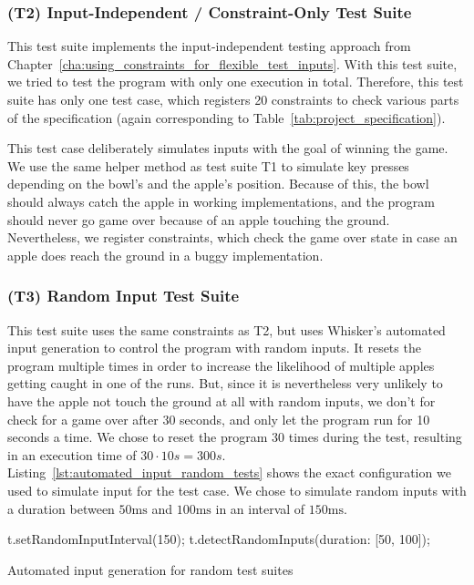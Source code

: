 \subsubsection{(T2) Input-Independent / Constraint-Only Test Suite}

This test suite implements the input-independent testing approach from Chapter~\ref{cha:using_constraints_for_flexible_test_inputs}.
With this test suite, we tried to test the program with only one execution in total.
Therefore, this test suite has only one test case, which registers 20 constraints to check various parts of the specification
(again corresponding to Table~\ref{tab:project_specification}).
\parspace

This test case deliberately simulates inputs with the goal of winning the game.
We use the same helper method as test suite T1 to simulate key presses depending on the bowl's and the apple's position.
Because of this, the bowl should always catch the apple in working implementations,
and the program should never go game over because of an apple touching the ground.
Nevertheless, we register constraints, which check the game over state in case an apple does reach the ground in a buggy implementation.

\subsubsection{(T3) Random Input Test Suite}

This test suite uses the same constraints as T2, but uses Whisker's automated input generation to control the program with random inputs.
It resets the program multiple times in order to increase the likelihood of multiple apples getting caught in one of the runs.
But, since it is nevertheless very unlikely to have the apple not touch the ground at all with random inputs,
we don't for check for a game over after 30 seconds, and only let the program run for 10 seconds a time.
We chose to reset the program 30 times during the test, resulting in an execution time of $30 \cdot 10s = 300s$.
Listing~\ref{lst:automated_input_random_tests} shows the exact configuration we used to simulate input for the test case.
We chose to simulate random inputs with a duration between $50\text{ms}$ and $100\text{ms}$ in an interval of $150\text{ms}$.
\parspace

\begin{listing}[htpb]
    \centering
    \begin{minipage}{.55\textwidth}
        \begin{javascriptcode}
            t.setRandomInputInterval(150);
            t.detectRandomInputs({duration: [50, 100]});
        \end{javascriptcode}
    \end{minipage}
    \caption{Automated input generation for random test suites}
    \label{lst:automated_input_random_tests}
\end{listing}

